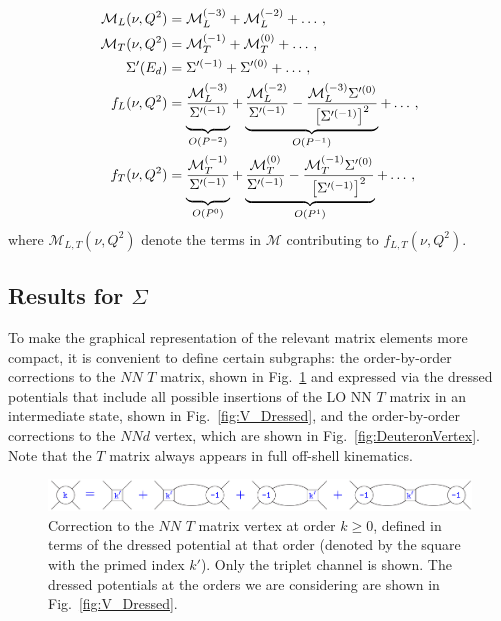 \documentclass[prl,
twocolumn,
showpacs,preprintnumbers,amsmath,amssymb,
superscriptaddress,
a4paper,nofootinbib,longbibliography]{revtex4-2}
\begin{document}
\begin{align}
    \mathcal{M}_L(\nu,Q^2) &= \mathcal{M}_L^{(-3)}+\mathcal{M}_L^{(-2)}+\dots\,,\\
    \mathcal{M}_T(\nu,Q^2) &= \mathcal{M}_T^{(-1)}+\mathcal{M}_T^{(0)}+\dots\,,\\
    \Sigma'(E_d) & = \Sigma^{\prime(-1)}+\Sigma^{\prime(0)}+\dots\,, \\
    f_L(\nu,Q^2) & = \underbrace{\vphantom{\Bigg[}\frac{\mathcal{M}_L^{(-3)}}{\Sigma^{\prime(-1)}}}_{O(P^{-2})}+\underbrace{\vphantom{\Bigg[}\frac{\mathcal{M}_L^{(-2)}}{\Sigma^{\prime(-1)}}-\frac{\mathcal{M}_L^{(-3)}\Sigma^{\prime(0)}}{\left[\Sigma^{\prime(-1)}\right]^2}}_{O(P^{-1})}+\dots\,,\\
    f_T(\nu,Q^2) & = \underbrace{\vphantom{\Bigg[}\frac{\mathcal{M}_T^{(-1)}}{\Sigma^{\prime(-1)}}}_{O(P^{0})}+\underbrace{\vphantom{\Bigg[}\frac{\mathcal{M}_T^{(0)}}{\Sigma^{\prime(-1)}}-\frac{\mathcal{M}_T^{(-1)}\Sigma^{\prime(0)}}{\left[\Sigma^{\prime(-1)}\right]^2}}_{O(P^{1})}+\dots\,,
\end{align}
where $\mathcal{M}_{L,T}(\nu,Q^2)$ denote the terms in $\mathcal{M}$ contributing to $f_{L,T}(\nu,Q^2)$.
\subsection{Results for $\Sigma$}
To make the graphical representation of the relevant matrix elements more compact,
it is convenient to define certain subgraphs: the order-by-order corrections to the $NN$ $T$ matrix, shown in Fig.~\ref{fig:Tmatrix} and expressed via the dressed potentials that include all possible insertions of the LO NN $T$ matrix in an intermediate state, shown in Fig.~\ref{fig:V_Dressed}, and the order-by-order corrections to the $NNd$ vertex, which are shown in Fig.~\ref{fig:DeuteronVertex}. Note that the $T$ matrix always appears in full off-shell kinematics.
\begin{figure}[htb]
    \centering
    \includegraphics[width=\textwidth]{figs/M_Orders_General_v1.pdf}
    \caption{Correction to the $NN$ $T$ matrix vertex at order $k\ge 0$, defined in terms of the dressed potential at that order (denoted by the square with the primed index $k'$). Only the triplet channel is shown. The dressed potentials at the orders we are considering are shown in Fig.~\ref{fig:V_Dressed}.}
    \label{fig:Tmatrix}
\end{figure}
\end{document}
